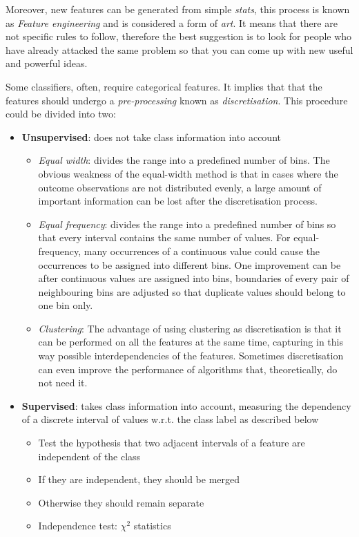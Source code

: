 Moreover, new features can be generated from simple \emph{stats}, this process is known as \emph{Feature engineering} and  is considered a form of \emph{art}. It means that there are not specific rules to follow,  therefore the best suggestion is to look for people who have already attacked the same problem so that you can come up with new useful and powerful ideas.

Some classifiers, often, require categorical features. It implies that that the features should undergo a \emph{pre-processing} known as \emph{discretisation}. This procedure could be divided into two:
\begin{itemize}
\item \textbf{Unsupervised}: does not take class information into account
\begin{itemize}
\item \emph{Equal width}: divides the range into a predefined number of bins. The obvious weakness of the equal-width method is that in cases where the outcome observations are not distributed evenly, a large amount of important information can be lost after the discretisation process. 

\item \emph{Equal frequency}: divides the range into a predefined number of bins so that every interval contains the same number of values. For equal-frequency, many occurrences of a continuous value could cause the occurrences to be assigned into different bins. One improvement can be after continuous values are assigned into bins, boundaries of every pair of neighbouring bins are adjusted so that duplicate values should belong to one bin only.

\item \emph{Clustering}: The advantage of using clustering as discretisation is that it can be performed on all the features at the same time, capturing in this way possible interdependencies of the features. Sometimes discretisation can even improve the performance of algorithms that, theoretically, do not need it.
\end{itemize}

\item \textbf{Supervised}: takes class information into account, measuring the dependency of a discrete interval of values w.r.t. the class label as described below

\begin{itemize}
\item Test the hypothesis that two adjacent intervals of a feature are independent of the class 
\item If they are independent, they should be merged
\item Otherwise they should remain separate
\item Independence test: $\chi^2$ statistics
\end{itemize}
\end{itemize}

